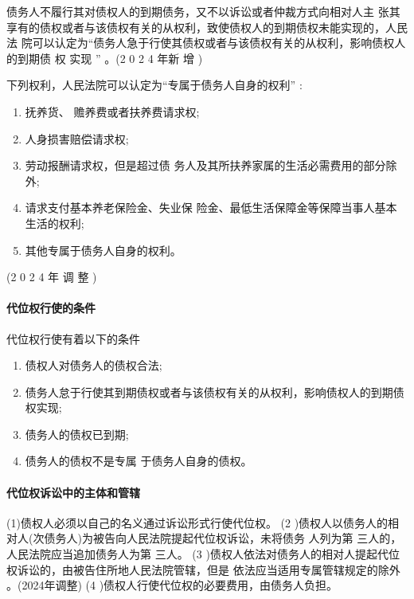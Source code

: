 \documentclass[UTF8,12pt]{ctexart}
\numberwithin{equation}{section} %
\numberwithin{figure}{section}
\numberwithin{table}{section}
\begin{document}
	债务人不履行其对债权人的到期债务，又不以诉讼或者仲裁方式向相对人主 张其享有的债权或者与该债权有关的从权利，致使债权人的到期债权未能实现的，人民法 院可以认定为“债务人急于行使其债权或者与该债权有关的从权利，影响债权人的到期债 权 实现 ” 。(2 0 2 4 年新 增 ) 
	
	下列权利，人民法院可以认定为“专属于债务人自身的权利” :
	\begin{enumerate}
		\item 抚养货、 赡养费或者扶养费请求权;
		
		\item 人身损害赔偿请求权;
		
		\item 劳动报酬请求权，但是超过债 务人及其所扶养家属的生活必需费用的部分除外;
		
		\item 请求支付基本养老保险金、失业保 险金、最低生活保障金等保障当事人基本生活的权利;
		
		\item 其他专属于债务人自身的权利。
	\end{enumerate} (2 0 2 4 年 调 整 )
	
	
	\paragraph{代位权行使的条件}代位权行使有着以下的条件
	\begin{enumerate}
		\item 债权人对债务人的债权合法;
		
		\item 债务人怠于行使其到期债权或者与该债权有关的从权利，影响债权人的到期债权实现; 
		
		\item 债务人的债权已到期;
		
		\item 债务人的债权不是专属 于债务人自身的债权。
	\end{enumerate}
	
	
	\paragraph{代位权诉讼中的主体和管辖}
	(1)债权人必须以自己的名义通过诉讼形式行使代位权。
	(2 )债权人以债务人的相对人(次债务人)为被告向人民法院提起代位权诉讼，未将债务 人列为第 三人的，人民法院应当追加债务人为第 三人。
	(3 )债权人依法对债务人的相对人提起代位权诉讼的，由被告住所地人民法院管辖，但是 依法应当适用专属管辖规定的除外 。(2024年调整)
	(4 )债权人行使代位权的必要费用，由债务人负担。
	
\end{document}
